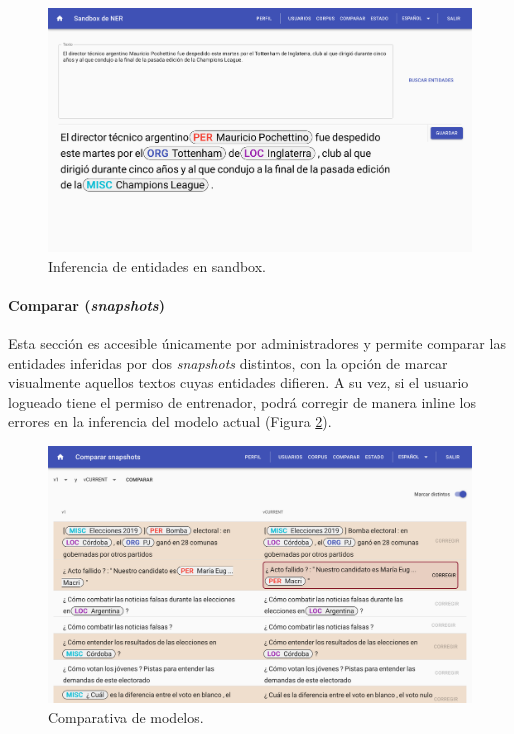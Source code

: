 \documentclass[12pt,a4paper,]{scrartcl}
\let\oldparagraph\paragraph
\renewcommand{\paragraph}[1]{\oldparagraph{#1}\mbox{}}
\begin{document}
\begin{figure}[H]

{\centering \includegraphics{assets/logic/sandbox.pdf} 

}

\caption{Inferencia de entidades en sandbox.}\label{fig:logic-sandbox}
\end{figure}

\hypertarget{comparar-snapshots}{%
\paragraph{\texorpdfstring{Comparar (\emph{snapshots})}{Comparar (snapshots)}}\label{comparar-snapshots}}

Esta sección es accesible únicamente por administradores y permite comparar las entidades inferidas por dos \emph{snapshots} distintos, con la opción de marcar visualmente aquellos textos cuyas entidades difieren. A su vez, si el usuario logueado tiene el permiso de entrenador, podrá corregir de manera inline los errores en la inferencia del modelo actual (Figura \ref{fig:logic-compare}).

\begin{figure}[H]

{\centering \includegraphics{assets/logic/compare.pdf} 

}

\caption{Comparativa de modelos.}\label{fig:logic-compare}
\end{figure}
\end{document}
